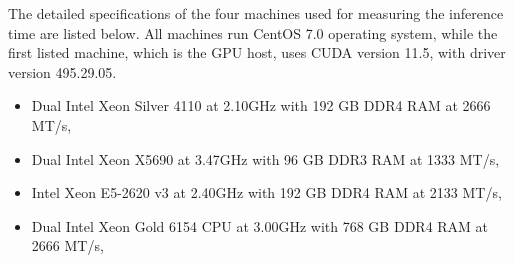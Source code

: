 The detailed specifications of the four machines used for measuring the inference time are listed below. All machines run CentOS 7.0 operating system, while the first listed machine, which is the GPU host, uses CUDA version 11.5, with driver version 495.29.05.

\begin{itemize}
  \item Dual Intel Xeon Silver 4110 at 2.10GHz with 192 GB DDR4 RAM at 2666 MT/s,
  \item Dual Intel Xeon X5690 at 3.47GHz with 96 GB DDR3 RAM at 1333 MT/s,
  \item Intel Xeon E5-2620 v3 at 2.40GHz with 192 GB DDR4 RAM at 2133 MT/s,
  \item Dual Intel Xeon Gold 6154 CPU at 3.00GHz with 768 GB DDR4 RAM at 2666 MT/s,
\end{itemize}

